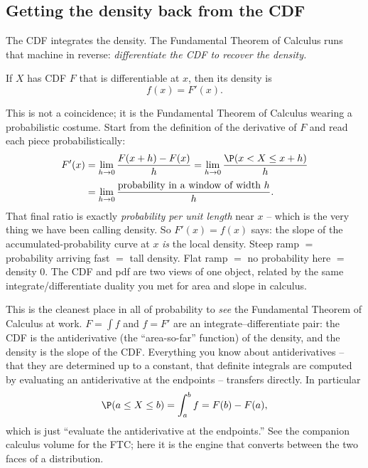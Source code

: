 \subsection{Getting the density back from the CDF}
\label{ch10:density-from-cdf}

The CDF integrates the density. The Fundamental Theorem of Calculus runs that
machine in reverse: \emph{differentiate the CDF to recover the density.}

\begin{theorem}
\label{ch10:thm-fdash}
If $X$ has CDF $F$ that is differentiable at $x$, then its density is
\[
  f(x) = F'(x) .
\]
\end{theorem}

\begin{whybox}
This is not a coincidence; it is the Fundamental Theorem of Calculus wearing a
probabilistic costume. Start from the definition of the derivative of $F$ and read
each piece probabilistically:
\[
  \begin{aligned}
  F'(x) &= \lim_{h \to 0} \frac{F(x+h) - F(x)}{h}
         = \lim_{h \to 0} \frac{\P(x < X \le x + h)}{h}\\[2pt]
        &= \lim_{h \to 0} \frac{\text{probability in a window of width } h}{h}.
  \end{aligned}
\]
That final ratio is exactly \emph{probability per unit length} near $x$ -- which is
the very thing we have been calling density. So $F'(x)=f(x)$ says: the slope of the
accumulated-probability curve at $x$ \emph{is} the local density. Steep ramp $=$
probability arriving fast $=$ tall density. Flat ramp $=$ no probability here $=$
density $0$. The CDF and pdf are two views of one object, related by the same
integrate/differentiate duality you met for area and slope in calculus.
\end{whybox}

\begin{connectionbox}
This is the cleanest place in all of probability to \emph{see} the Fundamental
Theorem of Calculus at work. $F = \int f$ and $f = F'$ are an
integrate--differentiate pair: the CDF is the antiderivative (the ``area-so-far''
function) of the density, and the density is the slope of the CDF. Everything you
know about antiderivatives -- that they are determined up to a constant, that
definite integrals are computed by evaluating an antiderivative at the endpoints --
transfers directly. In particular
\[
  \P(a \le X \le b) = \int_a^b f = F(b) - F(a),
\]
which is just ``evaluate the antiderivative at the endpoints.'' See the companion
calculus volume for the FTC; here it is the engine that converts between the two
faces of a distribution.
\end{connectionbox}


